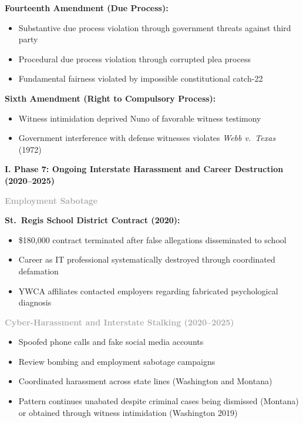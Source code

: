 \documentclass[11pt, letterpaper]{article}
\newcommand{\subsectiontitle}[1]{\vspace{0.15in}\noindent\textcolor{NavyBlue}{\textbf{#1}}\vspace{0.05in}}
\newcommand{\subsubsectiontitle}[1]{\vspace{0.1in}\noindent\textcolor{DarkGray}{\textbf{#1}}\vspace{0.05in}}
\begin{document}
\textbf{Fourteenth Amendment (Due Process):}
\begin{itemize}[leftmargin=*,itemsep=2pt]
    \item Substantive due process violation through government threats against third party
    \item Procedural due process violation through corrupted plea process
    \item Fundamental fairness violated by impossible constitutional catch-22
\end{itemize}

\textbf{Sixth Amendment (Right to Compulsory Process):}
\begin{itemize}[leftmargin=*,itemsep=2pt]
    \item Witness intimidation deprived Nuno of favorable witness testimony
    \item Government interference with defense witnesses violates \textit{Webb v.\ Texas} (1972)
\end{itemize}

\subsectiontitle{I. Phase 7: Ongoing Interstate Harassment and Career Destruction (2020--2025)}

\subsubsectiontitle{Employment Sabotage}

\textbf{St.\ Regis School District Contract (2020):}
\begin{itemize}[leftmargin=*,itemsep=2pt]
    \item \$180,000 contract terminated after false allegations disseminated to school
    \item Career as IT professional systematically destroyed through coordinated defamation
    \item YWCA affiliates contacted employers regarding fabricated psychological diagnosis
\end{itemize}

\subsubsectiontitle{Cyber-Harassment and Interstate Stalking (2020--2025)}
\begin{itemize}[leftmargin=*,itemsep=2pt]
    \item Spoofed phone calls and fake social media accounts
    \item Review bombing and employment sabotage campaigns
    \item Coordinated harassment across state lines (Washington and Montana)
    \item Pattern continues unabated despite criminal cases being dismissed (Montana) or obtained through witness intimidation (Washington 2019)
\end{itemize}
\end{document}

